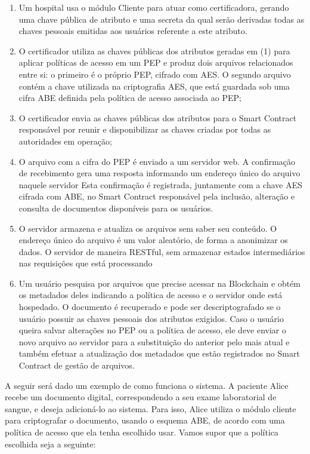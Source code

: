 \documentclass[a4paper,11pt]{article}
\begin{document}
\begin{enumerate}[label=(\arabic*)]
  \item Um hospital usa o módulo Cliente para atuar como certificadora, gerando uma chave pública de atributo e uma secreta da qual serão derivadas todas as chaves pessoais emitidas aos usuários referente a este atributo.
  \item O certificador utiliza as chaves públicas dos atributos geradas em (1) para aplicar políticas de acesso em um PEP e produz dois arquivos relacionados entre si:
  o primeiro é o próprio PEP, cifrado com AES.
  O segundo arquivo contém a chave utilizada na criptografia AES, que está guardada sob uma cifra ABE definida pela política de acesso associada ao PEP;%
  \item O certificador envia as chaves públicas dos atributos para o Smart Contract responsável por reunir e disponibilizar as chaves criadas por todas as autoridades em operação;
  \item O arquivo com a cifra do PEP é enviado a um servidor web.
  A confirmação de recebimento gera uma resposta informando um endereço único do arquivo naquele servidor
  Esta confirmação é registrada, juntamente com a chave AES cifrada com ABE, no Smart Contract responsável pela inclusão, alteração e consulta de documentos disponíveis para os usuários. %
  \item O servidor armazena e atualiza os arquivos sem saber seu conteúdo.
  O endereço único do arquivo é um valor aleatório, de forma a anonimizar os dados.
  O servidor de maneira RESTful, sem armazenar estados intermediários nas requisições que está processando
  \item Um usuário pesquisa por arquivos que precise acessar na Blockchain e obtém os metadados deles indicando a política de acesso e o servidor onde está hospedado.
  O documento é recuperado e pode ser descriptografado se o usuário possuir as chaves pessoais dos atributos exigidos.
  Caso o usuário queira salvar alterações no PEP ou a política de acesso, ele deve enviar o novo arquivo ao servidor para a substituição do anterior pelo mais atual e também efetuar a atualização dos metadados que estão registrados no Smart Contract de gestão de arquivos.
\end{enumerate}

A seguir será dado um exemplo de como funciona o sistema.
A paciente Alice recebe um documento digital, correspondendo a seu exame laboratorial de sangue, e deseja adicioná-lo ao sistema.
Para isso, Alice %
utiliza o módulo cliente para criptografar o documento, usando o esquema ABE, de acordo com uma política de acesso que ela tenha escolhido usar.
Vamos supor que a política escolhida seja a seguinte:
\end{document}
